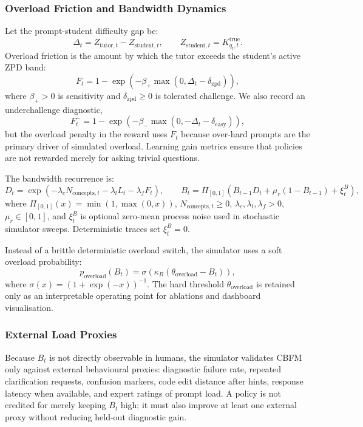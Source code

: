 \documentclass[11pt,a4paper]{report}
\begin{document}
\subsubsection{Overload Friction and Bandwidth Dynamics}
Let the prompt-student difficulty gap be:
\begin{equation}
    \Delta_t = Z_{\text{tutor},t} - Z_{\text{student},t},
    \qquad
    Z_{\text{student},t}=K^{\text{true}}_{q_t,t}.
\end{equation}
Overload friction is the amount by which the tutor exceeds the student's active ZPD band:
\begin{equation}
    F_t = 1-\exp\left(-\beta_+\max(0,\Delta_t-\delta_{\text{zpd}})\right),
\end{equation}
where $\beta_+>0$ is sensitivity and $\delta_{\text{zpd}}\ge0$ is tolerated challenge. We also record an underchallenge diagnostic,
\begin{equation}
    F_t^{-}=1-\exp\left(-\beta_-\max(0,-\Delta_t-\delta_{\text{easy}})\right),
\end{equation}
but the overload penalty in the reward uses $F_t$ because over-hard prompts are the primary driver of simulated overload. Learning gain metrics ensure that policies are not rewarded merely for asking trivial questions.

The bandwidth recurrence is:
\begin{equation}
    D_t = \exp\left(-\lambda_c N_{\text{concepts},t}-\lambda_l L_t-\lambda_fF_t\right),
    \qquad
    B_t = \Pi_{[0,1]}\left(B_{t-1}D_t+\mu_r(1-B_{t-1})+\xi_t^B\right),
\end{equation}
where $\Pi_{[0,1]}(x)=\min(1,\max(0,x))$, $N_{\text{concepts},t}\ge0$, $\lambda_c,\lambda_l,\lambda_f>0$, $\mu_r\in[0,1]$, and $\xi_t^B$ is optional zero-mean process noise used in stochastic simulator sweeps. Deterministic traces set $\xi_t^B=0$.

Instead of a brittle deterministic overload switch, the simulator uses a soft overload probability:
\begin{equation}
    p_{\text{overload}}(B_t)=
    \sigma\left(\kappa_B(\theta_{\text{overload}}-B_t)\right),
\end{equation}
where $\sigma(x)=(1+\exp(-x))^{-1}$. The hard threshold $\theta_{\text{overload}}$ is retained only as an interpretable operating point for ablations and dashboard visualisation.

\subsubsection{External Load Proxies}
Because $B_t$ is not directly observable in humans, the simulator validates CBFM only against external behavioural proxies: diagnostic failure rate, repeated clarification requests, confusion markers, code edit distance after hints, response latency when available, and expert ratings of prompt load. A policy is not credited for merely keeping $B_t$ high; it must also improve at least one external proxy without reducing held-out diagnostic gain.
\end{document}
